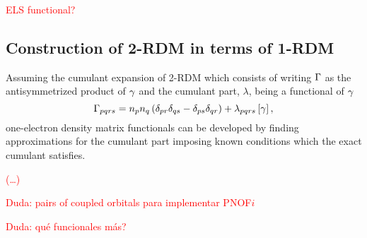\textcolor{red}{ELS functional?}

\subsection{Construction of 2-RDM in terms of 1-RDM}


Assuming the cumulant expansion of 2-RDM which
consists of writing $\Gamma$ as the antisymmetrized product of $\gamma$ and
the cumulant part, $\lambda$, being a functional of $\gamma$ 
\begin{equation}
    \Gamma_{pqrs} =
    n_p n_q \left( \delta_{pr} \delta_{qs} - \delta_{ps} \delta_{qr} \right)
    + \lambda_{pqrs} \left[ \gamma \right]
    ,
\end{equation}
one-electron density matrix functionals can be developed by finding
approximations for the cumulant part imposing known conditions which the exact
cumulant satisfies.

\textcolor{red}{(\ldots)}

\textcolor{red}{Duda: pairs of coupled orbitals para implementar PNOF$i$}

\textcolor{red}{Duda: qué funcionales más?}

